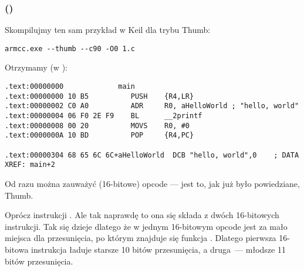 \subsubsection{\NonOptimizingKeilVI (\ThumbMode)}

Skompilujmy ten sam przykład w Keil dla trybu Thumb:

\begin{lstlisting}
armcc.exe --thumb --c90 -O0 1.c 
\end{lstlisting}

Otrzymamy (w \IDA):

\begin{lstlisting}[caption=\NonOptimizingKeilVI (\ThumbMode) + \IDA,style=customasmARM]
.text:00000000             main
.text:00000000 10 B5          PUSH    {R4,LR}
.text:00000002 C0 A0          ADR     R0, aHelloWorld ; "hello, world"
.text:00000004 06 F0 2E F9    BL      __2printf
.text:00000008 00 20          MOVS    R0, #0
.text:0000000A 10 BD          POP     {R4,PC}

.text:00000304 68 65 6C 6C+aHelloWorld  DCB "hello, world",0    ; DATA XREF: main+2
\end{lstlisting}

Od razu można zauważyć (16-bitowe) opcode --- jest to, jak już było powiedziane, Thumb.

Oprócz instrukcji .
Ale tak naprawdę to ona się składa z dwóch 16-bitowych instrukcji.
Tak się dzieje dlatego że w jednym 16-bitowym opcode jest za mało miejsca dla przesunięcia, po którym znajduje się funkcja \printf.
Dlatego pierwsza 16-bitowa instrukcja ładuje starsze 10 bitów przesunięcia, a druga~--- młodsze 11 bitów przesunięcia.



